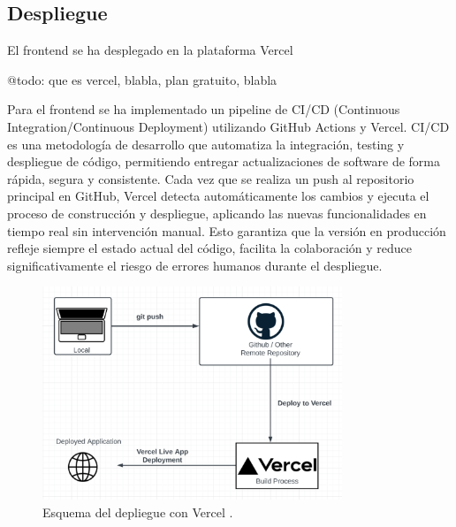 \subsection{Despliegue}

El frontend se ha desplegado en la plataforma Vercel

@todo: que es vercel, blabla, plan gratuito, blabla

Para el frontend se ha implementado un pipeline de CI/CD (Continuous Integration/Continuous Deployment) utilizando GitHub Actions y Vercel. CI/CD es una metodología de desarrollo que automatiza la integración, testing y despliegue de código, permitiendo entregar actualizaciones de software de forma rápida, segura y consistente. Cada vez que se realiza un push al repositorio principal en GitHub, Vercel detecta automáticamente los cambios y ejecuta el proceso de construcción y despliegue, aplicando las nuevas funcionalidades en tiempo real sin intervención manual. Esto garantiza que la versión en producción refleje siempre el estado actual del código, facilita la colaboración y reduce significativamente el riesgo de errores humanos durante el despliegue.


\begin{figure}[H]
  \centering
  \includegraphics[width=0.8\textwidth]{imagenes/cicd.png}
  \caption{Esquema del depliegue con Vercel \cite{cicdfoto}.}
  \label{fig:cicd}
\end{figure}
